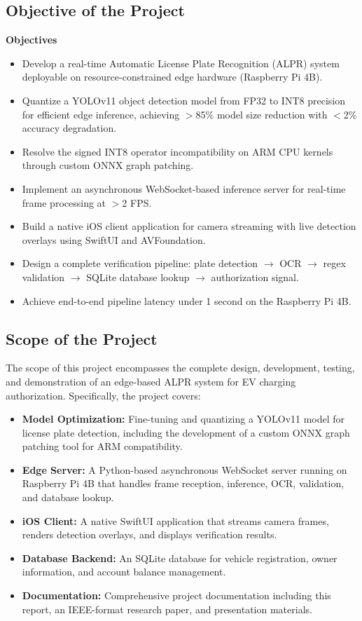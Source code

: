 \documentclass[11pt]{report}
\begin{document}
\subsection{Objective of the Project}
\textbf{Objectives}
\begin{itemize}
    \item Develop a real-time Automatic License Plate Recognition (ALPR) system deployable on resource-constrained edge hardware (Raspberry Pi 4B).
    \item Quantize a YOLOv11 object detection model from FP32 to INT8 precision for efficient edge inference, achieving $>$85\% model size reduction with $<$2\% accuracy degradation.
    \item Resolve the signed INT8 operator incompatibility on ARM CPU kernels through custom ONNX graph patching.
    \item Implement an asynchronous WebSocket-based inference server for real-time frame processing at $>$2 FPS.
    \item Build a native iOS client application for camera streaming with live detection overlays using SwiftUI and AVFoundation.
    \item Design a complete verification pipeline: plate detection $\to$ OCR $\to$ regex validation $\to$ SQLite database lookup $\to$ authorization signal.
    \item Achieve end-to-end pipeline latency under 1 second on the Raspberry Pi 4B.
\end{itemize}

\subsection{Scope of the Project}
The scope of this project encompasses the complete design, development, testing, and demonstration of an edge-based ALPR system for EV charging authorization. Specifically, the project covers:

\begin{itemize}
    \item \textbf{Model Optimization:} Fine-tuning and quantizing a YOLOv11 model for license plate detection, including the development of a custom ONNX graph patching tool for ARM compatibility.
    \item \textbf{Edge Server:} A Python-based asynchronous WebSocket server running on Raspberry Pi 4B that handles frame reception, inference, OCR, validation, and database lookup.
    \item \textbf{iOS Client:} A native SwiftUI application that streams camera frames, renders detection overlays, and displays verification results.
    \item \textbf{Database Backend:} An SQLite database for vehicle registration, owner information, and account balance management.
    \item \textbf{Documentation:} Comprehensive project documentation including this report, an IEEE-format research paper, and presentation materials.
\end{itemize}
\end{document}
